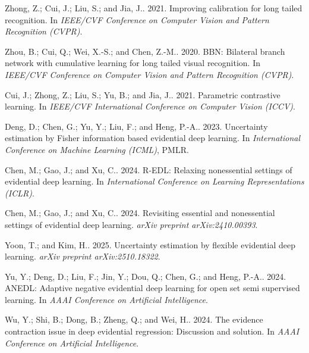 Zhong, Z.; Cui, J.; Liu, S.; and Jia, J.. 2021. 
\newblock Improving calibration for long tailed recognition. In {\em IEEE/CVF Conference on Computer Vision and Pattern Recognition (CVPR)}.

Zhou, B.; Cui, Q.; Wei, X.-S.; and Chen, Z.-M.. 2020. 
\newblock BBN: Bilateral branch network with cumulative learning for long tailed visual recognition. In {\em IEEE/CVF Conference on Computer Vision and Pattern Recognition (CVPR)}.

Cui, J.; Zhong, Z.; Liu, S.; Yu, B.; and Jia, J.. 2021. 
\newblock Parametric contrastive learning. In {\em IEEE/CVF International Conference on Computer Vision (ICCV)}.

Deng, D.; Chen, G.; Yu, Y.; Liu, F.; and Heng, P.-A.. 2023. 
\newblock Uncertainty estimation by Fisher information based evidential deep learning. In {\em International Conference on Machine Learning (ICML)}, PMLR.

Chen, M.; Gao, J.; and Xu, C.. 2024. 
\newblock R-EDL: Relaxing nonessential settings of evidential deep learning. In {\em International Conference on Learning Representations (ICLR)}.

Chen, M.; Gao, J.; and Xu, C.. 2024. 
\newblock Revisiting essential and nonessential settings of evidential deep learning. {\em arXiv preprint arXiv:2410.00393}.

Yoon, T.; and Kim, H.. 2025. 
\newblock Uncertainty estimation by flexible evidential deep learning. {\em arXiv preprint arXiv:2510.18322}.

Yu, Y.; Deng, D.; Liu, F.; Jin, Y.; Dou, Q.; Chen, G.; and Heng, P.-A.. 2024. 
\newblock ANEDL: Adaptive negative evidential deep learning for open set semi supervised learning. In {\em AAAI Conference on Artificial Intelligence}.

Wu, Y.; Shi, B.; Dong, B.; Zheng, Q.; and Wei, H.. 2024. 
\newblock The evidence contraction issue in deep evidential regression: Discussion and solution. In {\em AAAI Conference on Artificial Intelligence}.

